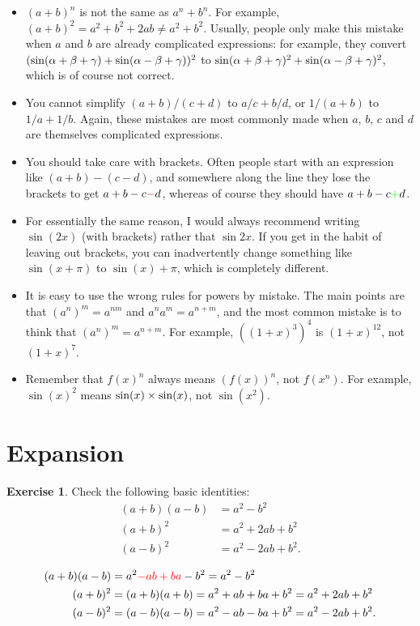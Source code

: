 \documentclass[a4paper]{book}
\theoremstyle{definition}
\newtheorem{exercise}[theorem]{Exercise}
\renewenvironment{solution}{\SolutionInline}{\endSolutionInline}
\begin{document}
\begin{itemize}
 \item $(a+b)^n$ is not the same as $a^n+b^n$.  For example,
  $(a+b)^2=a^2+b^2+2ab\neq a^2+b^2$.  Usually, people only make this
  mistake when $a$ and $b$ are already complicated expressions: for
  example, they convert $(\sin(\alpha+\beta+\gamma)+\sin(\alpha-\beta+\gamma))^2$ to
  $\sin(\alpha+\beta+\gamma)^2+\sin(\alpha-\beta+\gamma)^2$, which is of course not
  correct.
 \item You cannot simplify $(a+b)/(c+d)$ to $a/c+b/d$, or $1/(a+b)$ to
  $1/a+1/b$.  Again, these mistakes are most commonly made when $a$,
  $b$, $c$ and $d$ are themselves complicated expressions.
 \item You should take care with brackets.  Often people start with an
  expression like $(a+b)-(c-d)$, and somewhere along the line they
  lose the brackets to get $a+b-c{\color{red}-}d$, whereas of course they
  should have $a+b-c{\color{green}+}d$.
 \item For essentially the same reason, I would always recommend
  writing $\sin(2x)$ (with brackets) rather that $\sin 2x$.  If you
  get in the habit of leaving out brackets, you can inadvertently
  change something like $\sin(x+\pi)$ to $\sin(x)+\pi$, which is
  completely different.
 \item It is easy to use the wrong rules for powers by mistake.  The
  main points are that $(a^n)^m=a^{nm}$ and $a^na^m=a^{n+m}$, and the
  most common mistake is to think that $(a^n)^m=a^{n+m}$.  For
  example, $((1+x)^3)^4$ is $(1+x)^{12}$, not $(1+x)^7$.
 \item Remember that $f(x)^n$ always means $(f(x))^n$, not $f(x^n)$.
  For example, $\sin(x)^2$ means $\sin(x)\times\sin(x)$, not
  $\sin(x^2)$. 
\end{itemize}

\section{Expansion}
\label{sec-expand}

\begin{exercise}
 Check the following basic identities:
 \begin{align*}
  (a+b)(a-b) &= a^2 - b^2 \\
  (a+b)^2    &= a^2 + 2ab + b^2 \\
  (a-b)^2    &= a^2 - 2ab + b^2.
 \end{align*}
\end{exercise}
\begin{solution}
 \begin{align*}
  (a+b)(a-b) &= a^2 {\color{red} - ab + ba} - b^2 = a^2 - b^2 \\
  (a+b)^2 &= (a+b)(a+b) = a^2 + ab + ba + b^2 = a^2 + 2ab + b^2 \\
  (a-b)^2 &= (a-b)(a-b) = a^2 - ab - ba + b^2 = a^2 - 2ab + b^2.
 \end{align*}
\end{solution}
\end{document}
